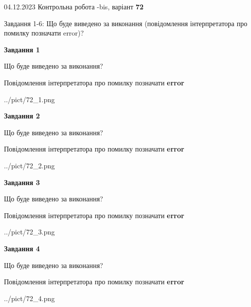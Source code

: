 \documentclass[12pt, ukrainian]{article}
\begin{document}
{{04.12.2023 Контрольна робота -bis, варіант  \No \textbf { 72 }\par}}
{

Завдання 1-6: Що буде виведено за виконання (повідомлення інтерпретатора про помилку позначати error)?


{\begin {center}\textbf{Завдання 1}\end {center}}\par
Що буде виведено за виконання? \par
Повідомлення інтерпретатора про помилку позначати \textbf{error}

\begin{center}
	{../pict/72_1.png}
\end{center}
\newpage

{\begin {center}\textbf{Завдання 2}\end {center}}\par
Що буде виведено за виконання? \par
Повідомлення інтерпретатора про помилку позначати \textbf{error}

\begin{center}
	{../pict/72_2.png}
\end{center}
\newpage

{\begin {center}\textbf{Завдання 3}\end {center}}\par
Що буде виведено за виконання? \par
Повідомлення інтерпретатора про помилку позначати \textbf{error}

\begin{center}
	{../pict/72_3.png}
\end{center}
\newpage

{\begin {center}\textbf{Завдання 4}\end {center}}\par
Що буде виведено за виконання? \par
Повідомлення інтерпретатора про помилку позначати \textbf{error}

\begin{center}
	{../pict/72_4.png}
\end{center}
\newpage

}
\end{document}
